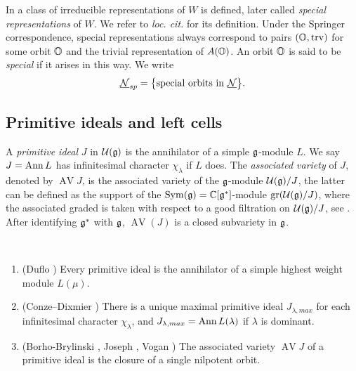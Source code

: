 \documentclass[reqno]{amsart}
\newcommand{\ubar}[1]{\underline{#1}}
\DeclareMathOperator{\AV}{AV}
\DeclareMathOperator{\trv}{trv}
\begin{document}
In \cite{Lusztig:sp-1} a class of irreducible representations of $W$ is defined, later called \textit{special representations} of $W$. We refer to \textit{loc. cit.} for its definition. Under the Springer correspondence, special representations always correspond to pairs $(\BO, \trv)$ for some orbit $\mathbb{O}$ and the trivial representation of $A(\mathbb{O})$. An orbit $\mathbb{O}$ is said to be \textit{special} if it arises in this way. We write
\begin{equation*}
	\ubar \cN_{sp} = \big\{ \text{special orbits in } \ubar \cN \big\}.
\end{equation*}





\subsection{Primitive ideals and left cells}

A \textit{primitive ideal} $J$ in $\mathcal{U}(\mathfrak{g})$ is the annihilator of a simple $\mathfrak{g}$-module $L$. We say $J = \operatorname{Ann} L$ has infinitesimal character $\chi_\lambda$ if $L$ does. The \textit{associated variety} of $J$, denoted by $\AV J$, is the associated variety of the $\mathfrak{g}$-module $\mathcal{U}(\mathfrak{g})/J$, the latter can be defined as the support of the $\operatorname{Sym}(\mathfrak{g}) = \mathbb{C}[\mathfrak{g}^*]$-module $\operatorname{gr} (\mathcal{U}(\mathfrak{g})/J)$, where the associated graded is taken with respect to a good filtration on $\mathcal{U}(\mathfrak{g})/J$, see \cite[Appendix D]{HTT}. After identifying $\mathfrak{g}^*$ with $\mathfrak{g}$, $\AV(J)$ is a closed subvariety in $\mathfrak{g}$. %

\begin{theorem}~
	\begin{enumerate}[label=(\roman*)]
		\item (Duflo \cite{Duflo:prim}) Every primitive ideal is the annihilator of a simple highest weight module $L(\mu)$.
		
		\item (Conze–Dixmier \cite{Conze-Dixmier}) There is a unique maximal primitive ideal $J_{\lambda,max}$ for each infinitesimal character $\chi_\lambda$, and $J_{\lambda,max} = \operatorname{Ann} L(\lambda)$ if $\lambda$ is dominant.
		
		\item (Borho-Brylinski \cite{Borho-Brylsinki:diff-op-1}, Joseph \cite{Joseph:prim}, Vogan \cite{Vogan:AV}) The associated variety $\AV J$ of a primitive ideal is the closure of a single nilpotent orbit.
	\end{enumerate}
\end{theorem}
\end{document}
